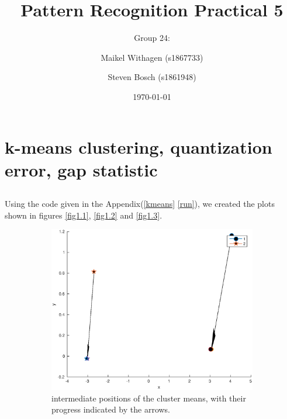 \documentclass[10pt]{article}
\title{Pattern Recognition Practical 5}
\author{Group 24: \and Maikel Withagen (s1867733) \and Steven Bosch (s1861948)}
\date{\today}
\begin{document}
\maketitle

\section{k-means clustering, quantization error, gap statistic}
\subsection{}
Using the code given in the Appendix(\ref{kmeans} \ref{run}), 
we created the plots shown in figures \ref{fig1.1}, \ref{fig1.2} and \ref{fig1.3}.\\

\begin{figure}[H]
  \centering
  \caption{Results for k=2}
  \begin{subfigure}[b]{.45\textwidth}
    \includegraphics[width=\columnwidth]{Fig1_k2.eps}
    \caption{intermediate positions of the cluster means, 
    with their progress indicated by the arrows.}
    \label{fig1a}
  \end{subfigure}
  \quad
  \begin{subfigure}[b]{.45\textwidth}

\end{subfigure}
\end{figure}
\end{document}
